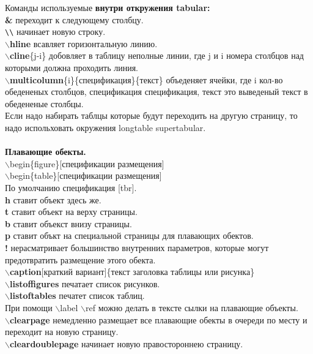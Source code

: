 \documentclass{article}
\newcommand{\bs}{$\backslash$}
\newcommand{\bd}[1]{{\bfseries #1}} %
\newcommand{\bb}[1]{\bd{\bs #1}} %
\begin{document}
Команды используемые \bd{внутри откружения tabular:}\\
\bd{\&} переходит к следующему столбцу.\\
\verb|\\| начинает новую строку.\\
\bb{hline} всавляет горизонтальную линию.\\
\bb{cline}\{j-i\} добовляет в таблицу неполные линии,
где j и i номера столбцов над которыми должна проходить линия.\\
\bb{multicolumn}\{i\}\{спецификация\}\{текст\} объеденяет ячейки,
где i кол-во обедененых столбцов, спецификация спецификация,
текст это выведеный текст в обедененые столбцы.\\

Если надо набирать таблцы которые будут переходить на другую страницу,
то надо испольховать окружения longtable supertabular.\\ \\

\bd{Плавающие обекты.}\\
\bs begin\{figure\}[спецификации размещения]\\
\bs begin\{table\}[спецификации размещения]\\
По умолчанию спецификация [tbr].\\
\bd{h} ставит объект здесь же.\\
\bd{t} ставит объект на верху страницы.\\
\bd{b} ставит объекст внизу страницы.\\
\bd{p} ставит объкт на специальной страницы для плавающих обектов.\\
\bd{!} нерасматривает большинство внутренних параметров,
которые могут предотвратить размещение этого обекта.\\
\bb{caption}[краткий вариант]\{текст заголовка таблицы или рисунка\}\\
\bb{listoffigures} печатает список рисунков.\\
\bb{listoftables} печатет список таблиц.\\
При помощи \bs label \bs ref можно делать в тексте сылки на плавающие объекты.\\
\bb{clearpage} немедленно размещает все плавающие обекты в очереди по месту
и переходит на новую страницу.\\
\bb{cleardoublepage} начинает новую правостороннею страницу.\\
\end{document}
